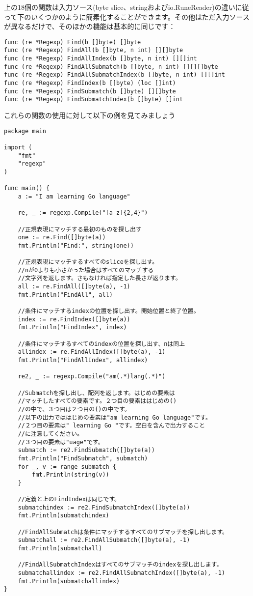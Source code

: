 上の18個の関数は入力ソース(byte slice、stringおよびio.RuneReader)の違いに従って下のいくつかのように簡素化することができます。その他はただ入力ソースが異なるだけで、そのほかの機能は基本的に同じです：

\begin{lstlisting}[numbers=none]
func (re *Regexp) Find(b []byte) []byte
func (re *Regexp) FindAll(b []byte, n int) [][]byte
func (re *Regexp) FindAllIndex(b []byte, n int) [][]int
func (re *Regexp) FindAllSubmatch(b []byte, n int) [][][]byte
func (re *Regexp) FindAllSubmatchIndex(b []byte, n int) [][]int
func (re *Regexp) FindIndex(b []byte) (loc []int)
func (re *Regexp) FindSubmatch(b []byte) [][]byte
func (re *Regexp) FindSubmatchIndex(b []byte) []int
\end{lstlisting}

これらの関数の使用に対して以下の例を見てみましょう

\begin{lstlisting}[numbers=none]
package main

import (
    "fmt"
    "regexp"
)

func main() {
    a := "I am learning Go language"

    re, _ := regexp.Compile("[a-z]{2,4}")

    //正規表現にマッチする最初のものを探し出す
    one := re.Find([]byte(a))
    fmt.Println("Find:", string(one))

    //正規表現にマッチするすべてのsliceを探し出す。
    //nが0よりも小さかった場合はすべてのマッチする
    //文字列を返します。さもなければ指定した長さが返ります。
    all := re.FindAll([]byte(a), -1)
    fmt.Println("FindAll", all)

    //条件にマッチするindexの位置を探し出す。開始位置と終了位置。
    index := re.FindIndex([]byte(a))
    fmt.Println("FindIndex", index)

    //条件にマッチするすべてのindexの位置を探し出す、nは同上
    allindex := re.FindAllIndex([]byte(a), -1)
    fmt.Println("FindAllIndex", allindex)

    re2, _ := regexp.Compile("am(.*)lang(.*)")

    //Submatchを探し出し、配列を返します。はじめの要素は
    //マッチしたすべての要素です。２つ目の要素ははじめの()
    //の中で、３つ目は２つ目の()の中です。
    //以下の出力でははじめの要素は"am learning Go language"です。
    //２つ目の要素は" learning Go "です。空白を含んで出力すること
    //に注意してください。
    //３つ目の要素は"uage"です。
    submatch := re2.FindSubmatch([]byte(a))
    fmt.Println("FindSubmatch", submatch)
    for _, v := range submatch {
        fmt.Println(string(v))
    }

    //定義と上のFindIndexは同じです。
    submatchindex := re2.FindSubmatchIndex([]byte(a))
    fmt.Println(submatchindex)

    //FindAllSubmatchは条件にマッチするすべてのサブマッチを探し出します。
    submatchall := re2.FindAllSubmatch([]byte(a), -1)
    fmt.Println(submatchall)

    //FindAllSubmatchIndexはすべてのサブマッチのindexを探し出します。
    submatchallindex := re2.FindAllSubmatchIndex([]byte(a), -1)
    fmt.Println(submatchallindex)
}
\end{lstlisting}

